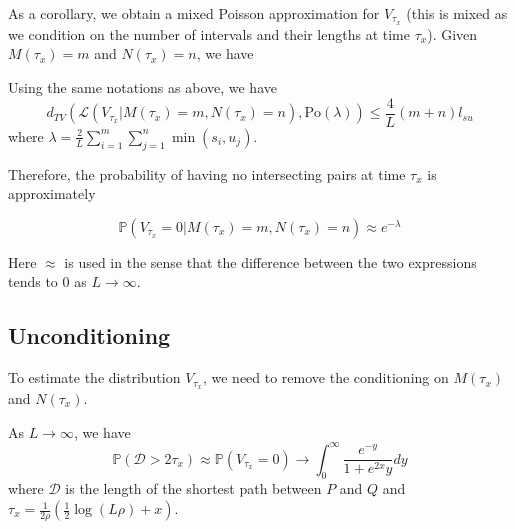 \documentclass{article}
\begin{document}
As a corollary, we obtain a mixed Poisson approximation for $V_{\tau_x}$ (this is mixed as we condition on the number of intervals and their lengths at time $\tau_x$). Given $M(\tau_x)=m$ and $N(\tau_x)=n$, we have

\begin{corollary}
    Using the same notations as above, we have
    \begin{equation*}
        d_{TV}(\mathcal{L}(V_{\tau_x}|M(\tau_x)=m, N(\tau_x)=n), \mathrm{Po}(\lambda)) \leq \frac{4}{L}(m+n) l_{su}
    \end{equation*}
    where $\lambda = \frac{2}{L}\sum_{i=1}^{m}\sum_{j=1}^{n} \min(s_i, u_j)$.
\end{corollary}

Therefore, the probability of having no intersecting pairs at time $\tau_x$ is approximately  

\begin{equation*}
    \mathbb{P} (V_{\tau_x} = 0 | M(\tau_x) = m, N(\tau_x) = n) \approx e^{-\lambda}
\end{equation*}

Here $\approx$ is used in the sense that the difference between the two expressions tends to $0$ as $L\to \infty$.  


\subsection{Unconditioning}

To estimate the distribution $V_{\tau_x}$, we need to remove the conditioning on $M(\tau_x)$ and $N(\tau_x)$.  

\begin{theorem}
    As $L\to \infty$, we have
    \begin{equation*}
        \mathbb{P}(\mathcal{D} > 2\tau_x) \approx \mathbb{P}(V_{\tau_x} = 0) \rightarrow \int_{0}^{\infty} \frac{e^{-y}}{1+e^{2x}y} dy
    \end{equation*}
    where $\mathcal{D}$ is the length of the shortest path between $P$ and $Q$ and $\tau_x=\frac{1}{2\rho}(\frac{1}{2}\log(L\rho)+x)$.
\end{theorem}
\end{document}
